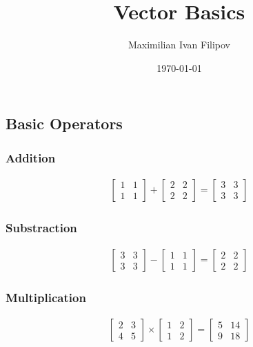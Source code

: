 \documentclass[12pt, a4paper]{article}
\title{Vector Basics}
\author{Maximilian Ivan Filipov}
\date{\today}
\begin{document}
\maketitle

\subsection{Basic Operators}

\subsubsection{Addition}
\begin{gather}
  \begin{bmatrix}
    1 & 1 \\
    1 & 1 
  \end{bmatrix}
  +
  \begin{bmatrix}
    2 & 2 \\
    2 & 2 
  \end{bmatrix}
  =
  \begin{bmatrix}
    3 & 3 \\
    3 & 3 
  \end{bmatrix}
\end{gather}

\subsubsection{Substraction}

\begin{gather}
  \begin{bmatrix}
   3 & 3 \\
   3 & 3 
  \end{bmatrix}
  -
  \begin{bmatrix}
   1 & 1 \\
   1 & 1 
  \end{bmatrix}
  =
  \begin{bmatrix}
   2 & 2 \\
   2 & 2 
  \end{bmatrix}
\end{gather}

\subsubsection{Multiplication}

\begin{gather}
  \begin{bmatrix}
   2 & 3 \\
   4 & 5 
  \end{bmatrix}
  \times
  \begin{bmatrix}
   1 & 2 \\
   1 & 2 
  \end{bmatrix}
  =
  \begin{bmatrix}
   5 & 14 \\
   9 & 18 
  \end{bmatrix}
\end{gather}
\end{document}
